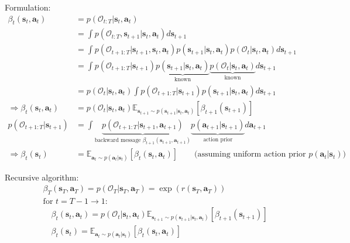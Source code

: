 Formulation:
\begin{align}
	\beta_t (\textbf{s}_t, \textbf{a}_t)
	&= p(\mathcal{O}_{t:T}| \textbf{s}_t, \textbf{a}_t)\\
	&= \int p(\mathcal{O}_{t:T}, \textbf{s}_{t+1}| \textbf{s}_t, \textbf{a}_t) d\textbf{s}_{t+1}\\
	&= \int p(\mathcal{O}_{t+1:T}| \textbf{s}_{t+1}, \textbf{s}_t, \textbf{a}_t) p(\textbf{s}_{t+1} | \textbf{s}_t, \textbf{a}_t) p(\mathcal{O}_t| \textbf{s}_t, \textbf{a}_t) d\textbf{s}_{t+1}\\
	&= \int p(\mathcal{O}_{t+1:T}| \textbf{s}_{t+1}) \underbrace{p(\textbf{s}_{t+1} | \textbf{s}_t, \textbf{a}_t)}_{\text{known}} \underbrace{p(\mathcal{O}_t| \textbf{s}_t, \textbf{a}_t)}_{\text{known}} d\textbf{s}_{t+1}\\
	&= p(\mathcal{O}_t| \textbf{s}_t, \textbf{a}_t) \int p(\mathcal{O}_{t+1:T}| \textbf{s}_{t+1}) p(\textbf{s}_{t+1} | \textbf{s}_t, \textbf{a}_t)  d\textbf{s}_{t+1}\\
	\Rightarrow \beta_t (\textbf{s}_t, \textbf{a}_t)
	&= p(\mathcal{O}_t| \textbf{s}_t, \textbf{a}_t) \mathbb{E}_{\textbf{s}_{t+1} \sim p(\textbf{s}_{t+1} | \textbf{s}_t, \textbf{a}_t)} \left[ \beta_{t+1}(\textbf{s}_{t+1}) \right]\\
	p(\mathcal{O}_{t+1:T}| \textbf{s}_{t+1})
	&= \int \underbrace{p(\mathcal{O}_{t+1:T} | \textbf{s}_{t+1}, \textbf{a}_{t+1})}_{\text{backward message } \beta_{t+1} (\textbf{s}_{t+1}, \textbf{a}_{t+1})} \underbrace{p(\textbf{a}_{t+1} | \textbf{s}_{t+1})}_{\text{action prior}} d\textbf{a}_{t+1}\\
	\Rightarrow \beta_t (\textbf{s}_t) &= \mathbb{E}_{\textbf{a}_t \sim p(\textbf{a}_t | \textbf{s}_t)} \left[ \beta_t (\textbf{s}_t, \textbf{a}_t) \right] \qquad \text{(assuming uniform action prior $p(\textbf{a}_t | \textbf{s}_t)$)}
\end{align}

Recursive algorithm:
\begin{align}
	&\beta_T(\textbf{s}_T, \textbf{a}_T) =  p(\mathcal{O}_T| \textbf{s}_T, \textbf{a}_T) = \exp (r(\textbf{s}_T, \textbf{a}_T))\\
	&\text{for }t = T-1 \rightarrow 1:\\
	&\quad\beta_t (\textbf{s}_t, \textbf{a}_t) = p(\mathcal{O}_t| \textbf{s}_t, \textbf{a}_t) \mathbb{E}_{\textbf{s}_{t+1} \sim p(\textbf{s}_{t+1} | \textbf{s}_t, \textbf{a}_t)} \left[ \beta_{t+1}(\textbf{s}_{t+1}) \right] \\
	&\quad\beta_t (\textbf{s}_t) = \mathbb{E}_{\textbf{a}_t \sim p(\textbf{a}_t | \textbf{s}_t)} \left[ \beta_t (\textbf{s}_t, \textbf{a}_t) \right]
\end{align}

